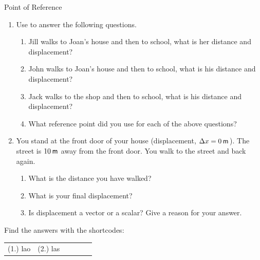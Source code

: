 \begin{exercises}{Point of Reference }
            \nopagebreak
        \label{m38788*id64042}\begin{enumerate}[noitemsep, label=\textbf{\arabic*}. ] 
            \label{m38788*uid20}\item Use  to answer the following questions.
\label{m38788*id64060}\begin{enumerate}[noitemsep, label=\textbf{\alph*}. ] 
            \label{m38788*uid21}\item Jill walks to Joan's house and then to school, what is her distance and displacement?
\label{m38788*uid22}\item John walks to Joan's house and then to school, what is his distance and displacement?
\label{m38788*uid23}\item Jack walks to the shop and then to school, what is his distance and displacement?
\label{m38788*uid24}\item What reference point did you use for each of the above questions?
\end{enumerate}
                \label{m38788*uid25}\item You stand at the front door of your house (displacement, $\Delta x=0\phantom{\rule{2pt}{0ex}}\mathsf{m}$). The street is $10\phantom{\rule{2pt}{0ex}}\mathsf{m}$ away from the front door. You walk to the street and back again.
\label{m38788*id64141}\begin{enumerate}[noitemsep, label=\textbf{\alph*}. ] 
            \label{m38788*uid26}\item What is the distance you have walked?
\label{m38788*uid27}\item What is your final displacement?
\label{m38788*uid28}\item Is displacement a vector or a scalar? Give a reason for your answer.
\end{enumerate}
                \end{enumerate}
  \label{m38788**end}
\par {} Find the answers with the shortcodes:
 \par \begin{tabular}[h]{cccccc}
 (1.) lao  &  (2.) las  & \end{tabular}
\end{exercises}
